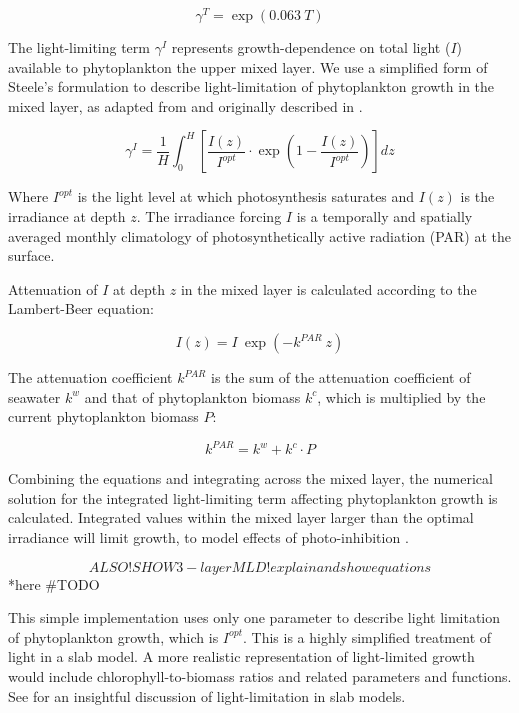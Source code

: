 \documentclass[journal abbreviation, manuscript]{copernicus}
\begin{document}
\begin{equation}
    \gamma^{T} = \exp{(0.063 \ T)} \label{mumax}
\end{equation}

The light-limiting term $\gamma^{I}$ represents growth-dependence on total light ($I$) available to phytoplankton the upper mixed layer. We use a simplified form of Steele's formulation to describe light-limitation of phytoplankton growth in the mixed layer, as adapted from \citet{Acevedo-Trejos2016} and originally described in \citet{Steele1962EnvironmentalSea}.

\begin{equation}
    \gamma^{I} = \frac{1}{H} \int_{0}^{H}\left[ \frac{I(z)}{I^{opt}} \cdot \exp{\left( 1 - \frac{I(z)}{I^{opt}} \right) }  \right]dz \label{steele1}
\end{equation}

Where $I^{opt}$ is the light level at which photosynthesis saturates and $I(z)$ is the irradiance at depth $z$.
The irradiance forcing $I$ is a temporally and spatially averaged monthly climatology of photosynthetically active radiation (PAR) at the surface. 

Attenuation of $I$ at depth $z$ in the mixed layer is calculated according to the Lambert-Beer equation:

\begin{equation}
    I(z) = I \ \exp{(-k^{PAR} \ z)} \label{beer}
\end{equation}

The attenuation coefficient $k^{PAR}$ is the sum of the attenuation coefficient of seawater $k^w$ and that of phytoplankton biomass $k^c$, which is multiplied by the current phytoplankton biomass $P$:

\begin{equation}
    k^{PAR} = k^w + k^c \cdot P
\end{equation}

Combining the equations and integrating across the mixed layer, the numerical solution for the integrated light-limiting term affecting phytoplankton growth is calculated. Integrated values within the mixed layer larger than the optimal irradiance will limit growth, to model effects of photo-inhibition \citep{Steele1962EnvironmentalSea}.

$$ALSO! SHOW 3-layer MLD! explain and show equations$$ *here #TODO

This simple implementation uses only one parameter to describe light limitation of phytoplankton growth, which is $I^{opt}$. This is a highly simplified treatment of light in a slab model. A more realistic representation of light-limited growth would include chlorophyll-to-biomass ratios and related parameters and functions. See \citet{Anderson2015c} for an insightful discussion of light-limitation in slab models.
\end{document}
